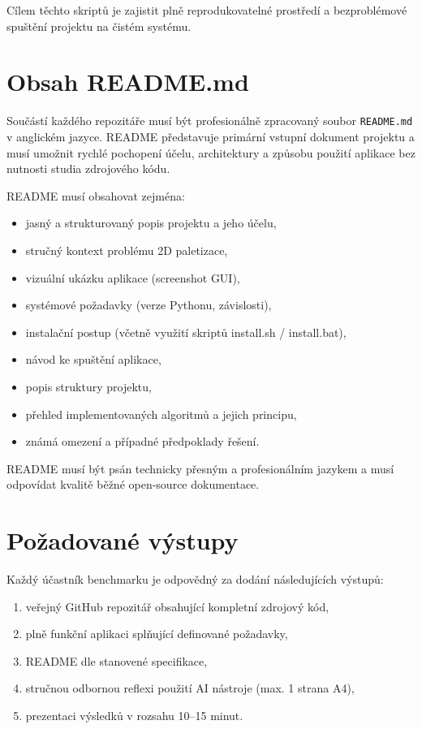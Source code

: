 \documentclass[12pt,a4paper]{article}
\begin{document}
Cílem těchto skriptů je zajistit plně reprodukovatelné prostředí a bezproblémové spuštění projektu na čistém systému.

\section{Obsah README.md}

Součástí každého repozitáře musí být profesionálně zpracovaný soubor
\texttt{README.md} v anglickém jazyce. README představuje primární
vstupní dokument projektu a musí umožnit rychlé pochopení účelu,
architektury a způsobu použití aplikace bez nutnosti studia zdrojového kódu.

README musí obsahovat zejména:

\begin{itemize}
    \item jasný a strukturovaný popis projektu a jeho účelu,
    \item stručný kontext problému 2D paletizace,
    \item vizuální ukázku aplikace (screenshot GUI),
    \item systémové požadavky (verze Pythonu, závislosti),
    \item instalační postup (včetně využití skriptů install.sh / install.bat),
    \item návod ke spuštění aplikace,
    \item popis struktury projektu,
    \item přehled implementovaných algoritmů a jejich principu,
    \item známá omezení a případné předpoklady řešení.
\end{itemize}

README musí být psán technicky přesným a profesionálním jazykem
a musí odpovídat kvalitě běžné open-source dokumentace.

\section{Požadované výstupy}

Každý účastník benchmarku je odpovědný za dodání následujících výstupů:

\begin{enumerate}
    \item veřejný GitHub repozitář obsahující kompletní zdrojový kód,
    \item plně funkční aplikaci splňující definované požadavky,
    \item README dle stanovené specifikace,
    \item stručnou odbornou reflexi použití AI nástroje (max. 1 strana A4),
    \item prezentaci výsledků v rozsahu 10--15 minut.
\end{enumerate}
\end{document}
